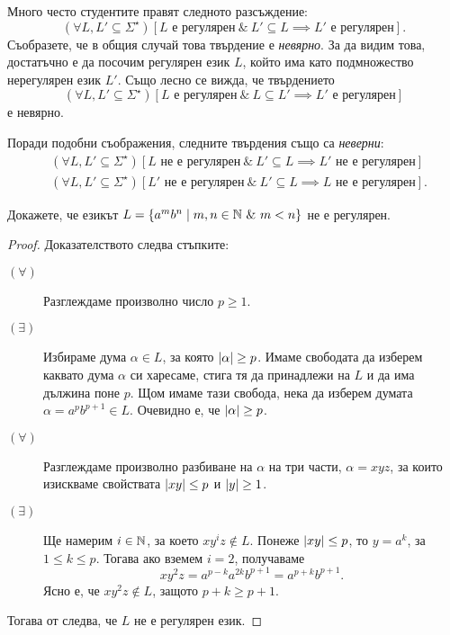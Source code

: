 \begin{remark}
  Много често студентите правят следното разсъждение:
  \[(\forall L,L' \subseteq \Sigma^\star)[L \text{ е регулярен}\ \&\ L' \subseteq L \implies L'\text{ е регулярен}].\]
  Съобразете, че в общия случай това твърдение е {\em невярно}.
  За да видим това, достатъчно е да посочим регулярен език $L$, който има като
  подмножество нерегулярен език $L'$.
  Също лесно се вижда, че твърдението
  \[(\forall L,L' \subseteq \Sigma^\star)[L \text{ е регулярен}\ \&\ L \subseteq L' \implies L'\text{ е регулярен}]\]
  е невярно.

  Поради подобни съображения, следните твърдения също са {\em неверни}:
  \begin{align*}
    & (\forall L,L' \subseteq \Sigma^\star)[L \text{ не е регулярен}\ \&\ L' \subseteq L \implies L'\text{ не е регулярен}]\\
    & (\forall L,L' \subseteq \Sigma^\star)[L' \text{ не е регулярен}\ \&\ L' \subseteq L \implies L\text{ не е регулярен}].
  \end{align*}
\end{remark}

\begin{problem}
  Докажете, че езикът $L = \{a^mb^n \mid m,n\in \mathbb{N}\ \&\ m < n\}$ не е регулярен.
\end{problem}
\begin{proof}
  Доказателството следва стъпките:
  \begin{description}
  \item[$(\forall)$]
    Разглеждаме произволно число $p \geq 1$.
  \item[$(\exists)$]
    Избираме дума $\alpha \in L$, за която $\vert{\alpha}\vert \geq p$. Имаме свободата да изберем каквато дума $\alpha$
    си харесаме, стига тя да принадлежи на $L$ и да има дължина поне $p$.
    Щом имаме тази свобода, нека да изберем думата $\alpha = a^{p}b^{p+1} \in L$. Очевидно е, че $\vert{\alpha}\vert \geq p$.
  \item[$(\forall)$]
    Разглеждаме произволно разбиване на $\alpha$ на три части, $\alpha = xyz$,
    за които изискваме свойствата $\vert{xy}\vert \leq p$ и $\vert{y}\vert \geq 1$.
  \item[$(\exists)$]
    Ще намерим $i\in\mathbb{N}$, за което $xy^iz \not\in L$.
    Понеже $\vert{xy}\vert \leq p$, то $y = a^k$, за  $1\leq k \leq p$.
    Тогава ако вземем $i = 2$, получаваме 
    \[xy^2z = a^{p-k}a^{2k}b^{p+1} = a^{p+k}b^{p+1}.\]
    Ясно е, че $xy^2z \not\in L$, защото $p+k \geq p+1$.
  \end{description}
  Тогава от  следва, че $L$ не е регулярен език.
\end{proof}

